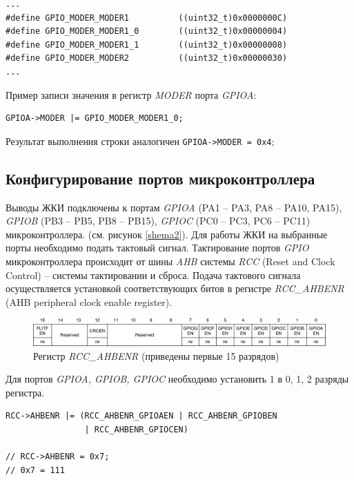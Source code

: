 \begin{verbatim}
...
#define GPIO_MODER_MODER1          ((uint32_t)0x0000000C)
#define GPIO_MODER_MODER1_0        ((uint32_t)0x00000004)
#define GPIO_MODER_MODER1_1        ((uint32_t)0x00000008)
#define GPIO_MODER_MODER2          ((uint32_t)0x00000030)
...
\end{verbatim}
Пример записи значения в регистр \textit{MODER} порта \textit{GPIOA}:
\begin{verbatim}
GPIOA->MODER |= GPIO_MODER_MODER1_0;
\end{verbatim}
Результат выполнения строки аналогичен \verb#GPIOA->MODER = 0x4#;





\subsection{Конфигурирование портов микроконтроллера}

Выводы ЖКИ подключены к портам \textit{GPIOA} (PA1 -- PA3, PA8 -- PA10, PA15), \textit{GPIOB} (PB3 -- PB5, PB8 -- PB15), \textit{GPIOC} (PC0 -- PC3, PC6 -- PC11) микроконтроллера. (см. рисунок \ref{shema2}). Для работы ЖКИ на выбранные порты необходимо подать тактовый сигнал. Тактирование портов\textit{ GPIO} микроконтроллера происходит от шины \textit{AHB} системы \textit{RCC} (Reset and Clock Control) -- системы тактировании и сброса. Подача тактового сигнала осуществляется установкой соответствующих битов в регистре \textit{RCC\_AHBENR} (AHB peripheral clock enable register). 


\begin{figure}[H]
\begin{center}
\includegraphics[scale=0.25]{Image/38.jpg} 
\end{center}
\caption{Регистр \textit{RCC\_AHBENR} (приведены первые 15 разрядов)}
\end{figure}

Для портов \textit{GPIOA, GPIOB, GPIOC} необходимо установить 1 в 0, 1, 2 разряды регистра. 

\begin{verbatim}
RCC->AHBENR |= (RCC_AHBENR_GPIOAEN | RCC_AHBENR_GPIOBEN
                | RCC_AHBENR_GPIOCEN)
                
// RCC->AHBENR = 0x7; 
// 0x7 = 111
\end{verbatim}

